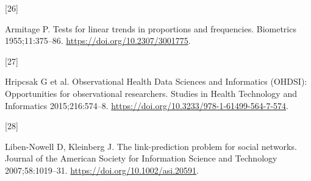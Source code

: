 \documentclass[
]{article}
\newlength{\cslhangindent}
\newlength{\csllabelwidth}
\newlength{\cslentryspacingunit} %
\newenvironment{CSLReferences}[2] %
 {%
  \setlength{\parindent}{0pt}
  \ifodd #1
  \let\oldpar\par
  \def\par{\hangindent=\cslhangindent\oldpar}
  \fi
  \setlength{\parskip}{#2\cslentryspacingunit}
 }%
 {}
\newcommand{\CSLLeftMargin}[1]{\parbox[t]{\csllabelwidth}{#1}}
\newcommand{\CSLRightInline}[1]{\parbox[t]{\linewidth - \csllabelwidth}{#1}\break}
\begin{document}
\begin{CSLReferences}{0}{0}
\leavevmode{}%
\CSLLeftMargin{{[}26{]} }%
\CSLRightInline{Armitage P. Tests for linear trends in proportions and
frequencies. Biometrics 1955;11:375--86.
\url{https://doi.org/10.2307/3001775}.}

\leavevmode{}%
\CSLLeftMargin{{[}27{]} }%
\CSLRightInline{Hripcsak G et al. Observational {Health Data Sciences
and Informatics} ({OHDSI}): Opportunities for observational researchers.
Studies in Health Technology and Informatics 2015;216:574--8.
\url{https://doi.org/10.3233/978-1-61499-564-7-574}.}

\leavevmode{}%
\CSLLeftMargin{{[}28{]} }%
\CSLRightInline{Liben-Nowell D, Kleinberg J. The link-prediction problem
for social networks. Journal of the American Society for Information
Science and Technology 2007;58:1019--31.
\url{https://doi.org/10.1002/asi.20591}.}

\end{CSLReferences}
\end{document}

